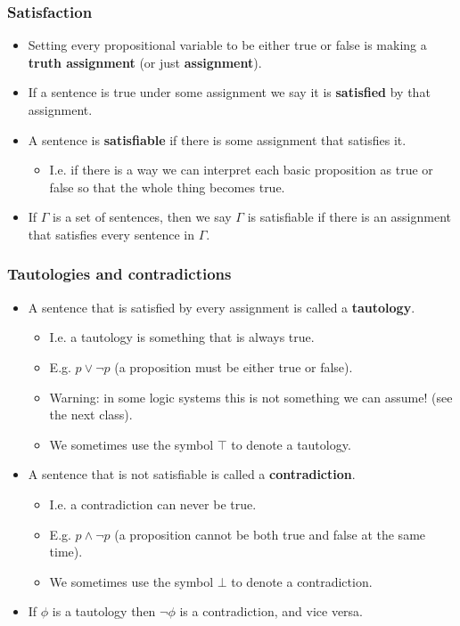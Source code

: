 \documentclass[handout]{beamer}
\begin{document}
\begin{frame}
\frametitle{Satisfaction}
\begin{itemize}
\item Setting every propositional variable to be either true or false is making a \textbf{truth assignment} (or just \textbf{assignment}). 
\vspace{0.3cm}
\item If a sentence is true under some assignment we say it is \textbf{satisfied} by that assignment. 
\vspace{0.3cm}
\item A sentence is \textbf{satisfiable} if there is some assignment that satisfies it. 
\begin{itemize}
\item I.e. if there is a way we can interpret each basic proposition as true or false so that the whole thing becomes true. 
\end{itemize}
\vspace{0.3cm}
\item If $\Gamma$ is a set of sentences, then we say $\Gamma$ is satisfiable if there is an assignment that satisfies every sentence in $\Gamma$. 
\end{itemize}
\end{frame}

\begin{frame}
\frametitle{Tautologies and contradictions}
\begin{itemize}
\item A sentence that is satisfied by every assignment is called a \textbf{tautology}. 
\begin{itemize}
\item I.e. a tautology is something that is always true.
\item E.g. $p\vee \neg p$ (a proposition must be either true or false). 
\item Warning: in some logic systems this is not something we can assume! (see the next class).  
\item We sometimes use the symbol $\top$ to denote a tautology. 
\end{itemize}
\vspace{0.3cm}
\item A sentence that is not satisfiable is called a \textbf{contradiction}. 
\begin{itemize}
\item I.e. a contradiction can never be true.
\item E.g. $p\wedge \neg p$ (a proposition cannot be both true and false at the same time). 
\item We sometimes use the symbol $\bot$ to denote a contradiction.
\end{itemize}
\vspace{0.3cm}
\item  If $\phi$ is a tautology then $\neg \phi$ is a contradiction, and vice versa.
\end{itemize}
\end{frame}
\end{document}
